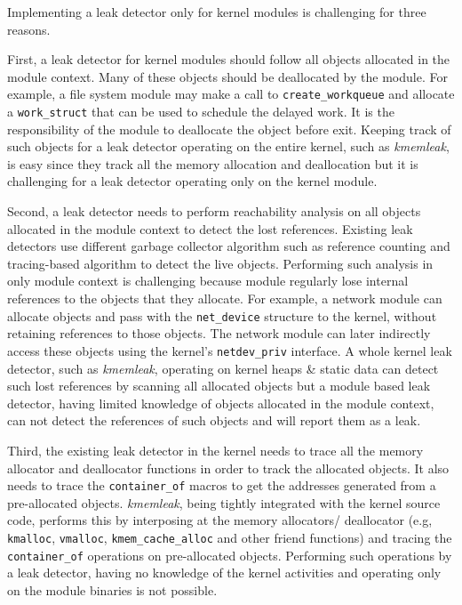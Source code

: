 
Implementing a leak detector only for kernel modules is challenging for three reasons. 

First, a leak detector for kernel modules should follow all objects allocated in the module context. Many of these objects should be deallocated by the module. For example, a file system module may make a call to \texttt{create\_workqueue} and allocate a \texttt{work\_struct} that can be used to schedule the delayed work. It is the responsibility of the module to deallocate the object before exit. Keeping track of such objects for a leak detector operating on the entire kernel, such as \emph{kmemleak}, is easy since they track all the memory allocation and deallocation but it is challenging for a leak detector operating only on the kernel module.  

Second, a leak detector needs to perform reachability analysis on all objects allocated in the module context to detect the lost references. Existing leak detectors use different garbage collector algorithm such as reference counting and tracing-based algorithm to detect the live objects. Performing such analysis in only module context is challenging because module regularly lose internal references to the objects that they allocate. For example, a network module can allocate objects and pass with the \texttt{net\_device} structure to the kernel, without retaining references to those objects. The network module can later indirectly access these objects using the kernel's \texttt{netdev\_priv} interface. A whole kernel leak detector, such as \emph{kmemleak}, operating on kernel heaps \& static data can detect such lost references by scanning all allocated objects but a module based leak detector, having limited knowledge of objects allocated in the module context, can not detect the references of such objects and will report them as a leak. 


Third, the existing leak detector in the kernel needs to trace all the memory allocator and deallocator functions in order to track the allocated objects. It also needs to trace the \texttt{container\_of} macros to get the addresses generated from a pre-allocated objects. \emph{kmemleak}, being tightly integrated with the kernel source code, performs this by interposing at the memory allocators/ deallocator (e.g, \texttt{kmalloc}, \texttt{vmalloc}, \texttt{kmem\_cache\_alloc} and other friend functions) and tracing the \texttt{container\_of} operations on pre-allocated objects. Performing such operations by a leak detector, having no knowledge of the kernel activities and operating only on the module binaries is not possible.


